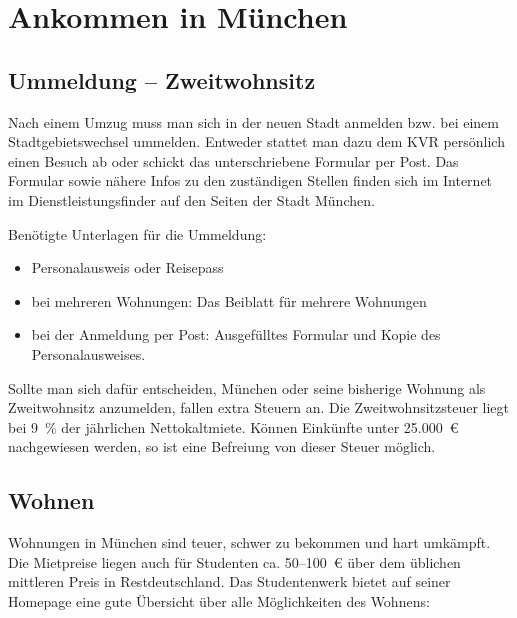 ﻿\chapter{Ankommen in München}

\section{Ummeldung -- Zweitwohnsitz}

Nach einem Umzug muss man sich in der neuen Stadt anmelden bzw. bei einem Stadtgebietswechsel ummelden. Entweder stattet man dazu dem KVR persönlich einen Besuch ab oder schickt das unterschriebene Formular per Post. Das Formular sowie nähere Infos zu den zuständigen Stellen finden sich im Internet im Dienstleistungsfinder auf den Seiten der Stadt München.

Benötigte Unterlagen für die Ummeldung: %
\begin{itemize}
	\item Personalausweis oder Reisepass
	\item bei mehreren Wohnungen: Das Beiblatt für mehrere Wohnungen
	\item bei der Anmeldung per Post: Ausgefülltes Formular und Kopie des Personalausweises.
\end{itemize}

Sollte man sich dafür entscheiden, München oder seine bisherige Wohnung als Zweitwohnsitz anzumelden, fallen extra Steuern an. Die Zweitwohnsitzsteuer liegt bei 9~\% der jährlichen Nettokaltmiete. Können Einkünfte unter 25.000~€ nachgewiesen werden, so ist eine Befreiung von dieser Steuer möglich.

\begin{urlList}
\end{urlList}

\section{Wohnen}
Wohnungen in München sind teuer, schwer zu bekommen und hart umkämpft. Die Mietpreise liegen
auch für Studenten ca. 50--100~€ über dem üblichen mittleren Preis in
Restdeutschland. Das Studentenwerk bietet auf seiner Homepage eine
gute Übersicht über alle Möglichkeiten des Wohnens:

